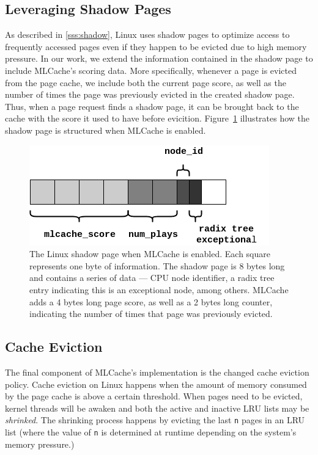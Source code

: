 \subsection{Leveraging Shadow Pages}

As described in \ref{sss:shadow}, Linux uses shadow pages to optimize access to frequently accessed
pages even if they happen to be evicted due to high memory pressure. In our work, we extend the information
contained in the shadow page to include MLCache's scoring data. More specifically, whenever a page
is evicted from the page cache, we include both the current page score, as well as the number of times
the page was previously evicted in the created shadow page. Thus, when a page request finds a shadow
page, it can be brought back to the cache with the score it used to have before evicition. Figure~\ref{fig:shadow}
illustrates how the shadow page is structured when MLCache is enabled.

\begin{figure}[h]
  \includegraphics[scale=0.4]{img/ShadowPage.png}
  \caption{The Linux shadow page when MLCache is enabled. Each square
  represents one byte of information.  The shadow page is 8 bytes long and
  contains a series of data --- CPU node identifier, a radix tree entry indicating
  this is an exceptional node, among others. MLCache adds a 4 bytes long page
  score, as well as a 2 bytes long counter, indicating the number of times that
  page was previously evicted.}
  \label{fig:shadow}
\end{figure}

\subsection{Cache Eviction}

The final component of MLCache's implementation is the changed cache eviction policy. Cache eviction
on Linux happens when the amount of memory consumed by the page cache is above a certain threshold.
When pages need to be evicted, kernel threads will be awaken and both the active and inactive
LRU lists may be \emph{shrinked}. The shrinking process happens by evicting the last \texttt{n}
pages in an LRU list (where the value of \texttt{n} is determined at runtime depending on the
system's memory pressure.)

